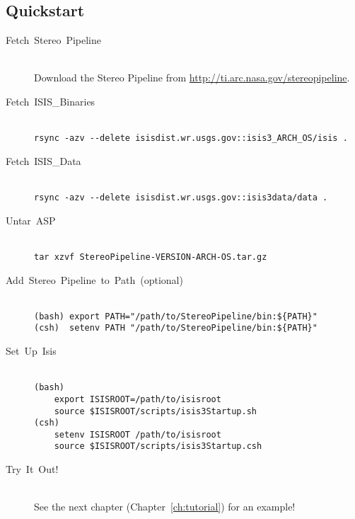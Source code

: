 \subsection{Quickstart}
\begin{description}

\item[{Fetch~Stereo~Pipeline}] ~\\
Download the Stereo Pipeline from \url{http://ti.arc.nasa.gov/stereopipeline}.

\item [{Fetch~\ac{ISIS}\_Binaries}] ~\\
\verb#rsync -azv --delete isisdist.wr.usgs.gov::isis3_ARCH_OS/isis .#

\item [{Fetch~\ac{ISIS}\_Data}] ~\\
\verb#rsync -azv --delete isisdist.wr.usgs.gov::isis3data/data .#

\item [{Untar~\acl{ASP}}] ~\\
\verb#tar xzvf StereoPipeline-VERSION-ARCH-OS.tar.gz#

\item [{Add~Stereo~Pipeline~to~Path~(optional)}] ~\\
\verb#(bash) export PATH="/path/to/StereoPipeline/bin:${PATH}"# \\
\verb#(csh)  setenv PATH "/path/to/StereoPipeline/bin:${PATH}"#

\pagebreak
\item[Set~Up~Isis] ~\\
\verb#(bash)# \\
\verb#    export ISISROOT=/path/to/isisroot# \\
\verb#    source $ISISROOT/scripts/isis3Startup.sh# \\
\verb#(csh)# \\
\verb#    setenv ISISROOT /path/to/isisroot# \\
\verb#    source $ISISROOT/scripts/isis3Startup.csh#

\item [{Try~It~Out!}] ~\\
See the next chapter (Chapter~\ref{ch:tutorial}) for an example!
\end{description}

